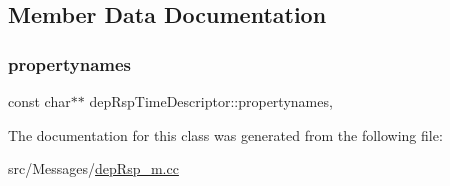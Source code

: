 \subsection{Member Data Documentation}
\mbox{\label{classdep_rsp_time_descriptor_aa00fe09f472957d38fb825d538d5c090}} 
\subsubsection{\texorpdfstring{propertynames}{propertynames}}
{\footnotesize\ttfamily const char$\ast$$\ast$ dep\+Rsp\+Time\+Descriptor\+::propertynames\hspace{0.3cm}{\ttfamily [mutable]}, {\ttfamily [private]}}



The documentation for this class was generated from the following file\+:\begin{DoxyCompactItemize}
\item 
src/\+Messages/\hyperlink{dep_rsp__m_8cc}{dep\+Rsp\+\_\+m.\+cc}\end{DoxyCompactItemize}

